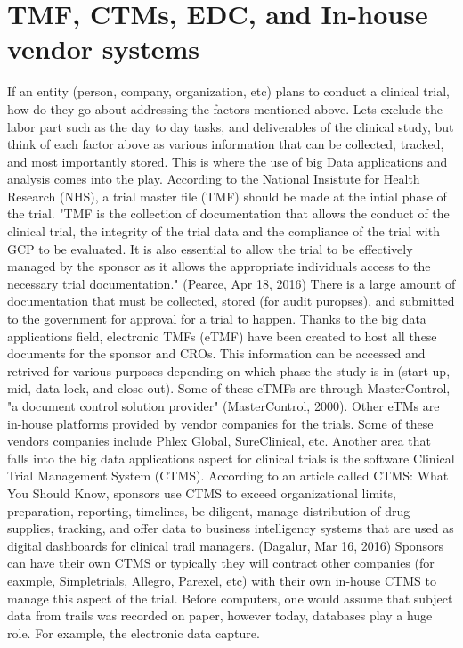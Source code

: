 \documentclass[sigconf]{acmart}
\begin{document}
{\section{TMF, CTMs, EDC, and In-house vendor systems}
If an entity (person, company, organization, etc) plans to conduct a clinical trial, how do they go about addressing the
factors mentioned above. Lets exclude the labor part such as the day to day tasks, and deliverables of the clinical study, but think of each factor above as various information that can be collected, tracked, and most importantly stored. 
This is where the use of big Data applications and analysis comes into the play. 
According to the National Insistute for Health Research (NHS), a trial master file (TMF) should be made at the intial phase of the trial. "TMF is the collection of documentation that allows the conduct of the clinical trial, the integrity of the trial data and the compliance of the trial with GCP to be evaluated.
It is also essential to allow the trial to be effectively managed by the sponsor as it allows the appropriate individuals access to the necessary trial documentation." (Pearce, Apr 18, 2016) 
There is a large amount of documentation that must be collected, stored (for audit puropses), and submitted to the government for approval for a trial to happen. 
Thanks to the big data applications field, electronic TMFs (eTMF) have been created to host all these documents for the sponsor and CROs. This information can be accessed and retrived for various purposes depending on which phase the study is in (start up, mid, data lock, and close out). 
Some of these eTMFs are through MasterControl, "a document control solution provider" (MasterControl, 2000). Other eTMs are in-house platforms provided by vendor companies for the trials. 
Some of these vendors companies include Phlex Global, SureClinical, etc.
Another area that falls into the big data applications aspect for clinical trials is the software Clinical Trial Management System (CTMS).
According to an article called CTMS: What You Should Know, sponsors use CTMS to exceed organizational limits, preparation, reporting, timelines, be diligent, manage distribution of drug supplies, tracking, and offer data to business intelligency systems that are used as digital dashboards for clinical trail managers. (Dagalur, Mar 16, 2016) 
Sponsors can have their own CTMS or typically they will contract other companies (for eaxmple, Simpletrials, Allegro, Parexel, etc) with their own in-house CTMS to manage this aspect of the trial. 
Before computers, one would assume that subject data from trails was recorded on paper, however today, databases play a huge role. For example, the electronic data capture.
}
\end{document}
